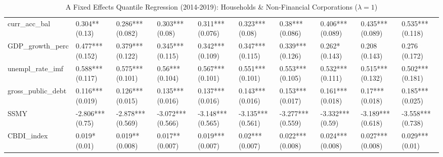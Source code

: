 \begin{table}[H]
{\begin{tabular}{llllllllll}
  curr\_acc\_bal & 0.304** (0.13) & 0.286*** (0.082) & 0.303*** (0.08) & 0.311*** (0.076) & 0.323*** (0.08) & 0.38*** (0.086) & 0.406*** (0.089) & 0.435*** (0.089) & 0.535*** (0.118) \\ 
  GDP\_growth\_perc & 0.477*** (0.152) & 0.379*** (0.122) & 0.345*** (0.115) & 0.342*** (0.109) & 0.347*** (0.115) & 0.339*** (0.126) & 0.262* (0.143) & 0.208 (0.143) & 0.276 (0.172) \\ 
  unempl\_rate\_imf & 0.588*** (0.117) & 0.575*** (0.101) & 0.56*** (0.104) & 0.567*** (0.101) & 0.551*** (0.101) & 0.553*** (0.105) & 0.532*** (0.111) & 0.515*** (0.132) & 0.502*** (0.181) \\ 
  gross\_public\_debt & 0.116*** (0.019) & 0.126*** (0.015) & 0.135*** (0.016) & 0.137*** (0.016) & 0.143*** (0.016) & 0.153*** (0.017) & 0.161*** (0.018) & 0.17*** (0.018) & 0.185*** (0.025) \\ 
  SSMY & -2.806*** (0.75) & -2.878*** (0.569) & -3.072*** (0.566) & -3.148*** (0.565) & -3.135*** (0.561) & -3.277*** (0.559) & -3.332*** (0.59) & -3.189*** (0.618) & -3.558*** (0.738) \\ 
  CBDI\_index & 0.019* (0.01) & 0.019** (0.008) & 0.017** (0.007) & 0.019*** (0.007) & 0.02*** (0.007) & 0.022*** (0.008) & 0.024*** (0.008) & 0.027*** (0.008) & 0.029*** (0.01) \\ 
   \bottomrule
\end{tabular}}
\caption{A Fixed Effects Quantile Regression (2014-2019): Households \& Non-Financial Corporations ($\lambda = 1$)} 
\label{qrfe1_npl_hh.nfi}
\end{table}
